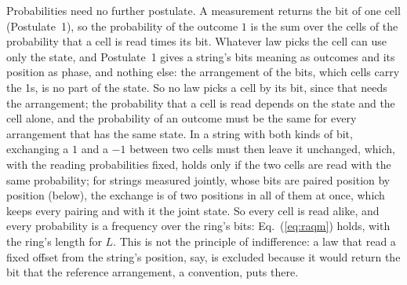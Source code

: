 \documentclass[aps,prd,twocolumn,superscriptaddress,nofootinbib,showkeys]{revtex4-2}
\begin{document}
Probabilities need no further postulate. A measurement returns the bit of one cell (Postulate~1), so the probability of the outcome $1$ is the sum over the cells of the probability that a cell is read times its bit. Whatever law picks the cell can use only the state, and Postulate~1 gives a string's bits meaning as outcomes and its position as phase, and nothing else: the arrangement of the bits, which cells carry the 1s, is no part of the state. So no law picks a cell by its bit, since that needs the arrangement; the probability that a cell is read depends on the state and the cell alone, and the probability of an outcome must be the same for every arrangement that has the same state. In a string with both kinds of bit, exchanging a $1$ and a $-1$ between two cells must then leave it unchanged, which, with the reading probabilities fixed, holds only if the two cells are read with the same probability; for strings measured jointly, whose bits are paired position by position (below), the exchange is of two positions in all of them at once, which keeps every pairing and with it the joint state. So every cell is read alike, and every probability is a frequency over the ring's bits: Eq.~(\ref{eq:raqm}) holds, with the ring's length for $L$. This is not the principle of indifference: a law that read a fixed offset from the string's position, say, is excluded because it would return the bit that the reference arrangement, a convention, puts there.
\end{document}
